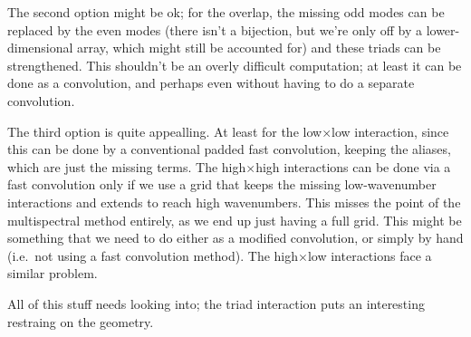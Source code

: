 \documentclass[10pt,showpacs,showkeys,%
amsfonts,amsmath,onecolumn,
floatfix,aps,superscriptaddress]{revtex4}
\begin{document}
The second option might be ok; for the overlap, the missing odd modes
can be replaced by the even modes (there isn't a bijection, but we're
only off by a lower-dimensional array, which might still be accounted 
for) and these triads can be strengthened. This shouldn't be an overly 
difficult computation; at least it can be done as a convolution, and 
perhaps even without having to do a separate convolution.

The third option is quite appealling. At least for the low$\times$low
interaction, since this can be done by a conventional padded fast
convolution, keeping the aliases, which are just the missing terms. 
The high$\times$high interactions can be done via a fast convolution
only if we use a grid that keeps the missing low-wavenumber interactions
and extends to reach high wavenumbers.  This misses the point of 
the multispectral method entirely, as we end up just having a full grid.
This might be something that we need to do either as a modified
convolution, or simply by hand (i.e.\ not using a fast convolution method).
The high$\times$low interactions face a similar problem. 

All of this stuff needs looking into; the triad interaction puts an
interesting restraing on the geometry.
\end{document}
